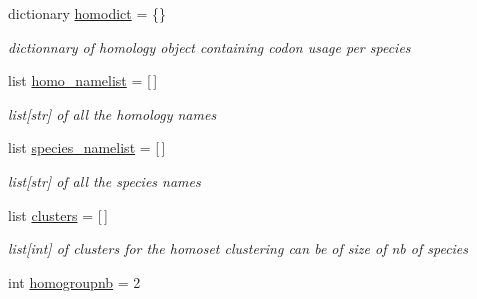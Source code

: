 \begin{DoxyCompactItemize}
\mbox{\label{class_py_c_u_b_1_1homoset_1_1_homo_set_ad09211d828ad602a1e3806829eb96f04}} 
dictionary \mbox{\hyperlink{class_py_c_u_b_1_1homoset_1_1_homo_set_ad09211d828ad602a1e3806829eb96f04}{homodict}} = \{\}
\begin{DoxyCompactList}\small\item\em dictionnary of homology object containing codon usage per species \end{DoxyCompactList}\item 
\mbox{\label{class_py_c_u_b_1_1homoset_1_1_homo_set_acbfe58dd06d4c6ca61a528ddfabee3d6}} 
list \mbox{\hyperlink{class_py_c_u_b_1_1homoset_1_1_homo_set_acbfe58dd06d4c6ca61a528ddfabee3d6}{homo\+\_\+namelist}} = \mbox{[}$\,$\mbox{]}
\begin{DoxyCompactList}\small\item\em list\mbox{[}str\mbox{]} of all the homology names \end{DoxyCompactList}\item 
\mbox{\label{class_py_c_u_b_1_1homoset_1_1_homo_set_a141708f3582bf009ec08b111124589b1}} 
list \mbox{\hyperlink{class_py_c_u_b_1_1homoset_1_1_homo_set_a141708f3582bf009ec08b111124589b1}{species\+\_\+namelist}} = \mbox{[}$\,$\mbox{]}
\begin{DoxyCompactList}\small\item\em list\mbox{[}str\mbox{]} of all the species names \end{DoxyCompactList}\item 
\mbox{\label{class_py_c_u_b_1_1homoset_1_1_homo_set_a1e216b6dd586b4d71d48db2bd9e82fd1}} 
list \mbox{\hyperlink{class_py_c_u_b_1_1homoset_1_1_homo_set_a1e216b6dd586b4d71d48db2bd9e82fd1}{clusters}} = \mbox{[}$\,$\mbox{]}
\begin{DoxyCompactList}\small\item\em list\mbox{[}int\mbox{]} of clusters for the homoset clustering can be of size of nb of species \end{DoxyCompactList}\item 
\mbox{\label{class_py_c_u_b_1_1homoset_1_1_homo_set_a7e0bb4c43fb89bb5165f509048a5025b}} 
int \mbox{\hyperlink{class_py_c_u_b_1_1homoset_1_1_homo_set_a7e0bb4c43fb89bb5165f509048a5025b}{homogroupnb}} = 2

\end{DoxyCompactItemize}
